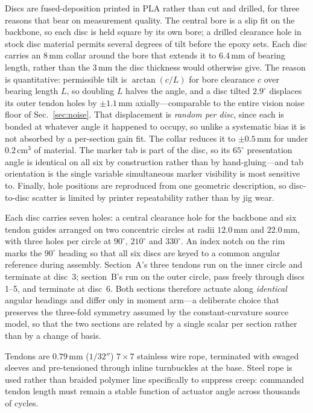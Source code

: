 \documentclass[letterpaper, 10pt, conference]{ieeeconf}
\begin{document}
Discs are fused-deposition printed in PLA rather than cut and drilled, for
three reasons that bear on measurement quality. The central bore is a
slip fit on the backbone, so each disc is held square by its own bore; a
drilled clearance hole in stock disc material permits several degrees of tilt
before the epoxy sets. Each disc carries an $8\,$mm collar around the bore
that extends it to $6.4\,$mm of bearing length, rather than the $3\,$mm the
disc thickness would otherwise give. The reason is quantitative: permissible
tilt is $\arctan(c/L)$ for bore clearance $c$ over bearing length $L$, so
doubling $L$ halves the angle, and a disc tilted $2.9^\circ$ displaces its
outer tendon holes by $\pm1.1\,$mm axially---comparable to the entire vision
noise floor of Sec.~\ref{sec:noise}. That displacement is \emph{random per
disc}, since each is bonded at whatever angle it happened to occupy, so
unlike a systematic bias it is not absorbed by a per-section gain fit. The
collar reduces it to $\pm0.5\,$mm for under $0.2\,$cm$^3$ of material. The marker tab is part of the disc, so its
$65^\circ$ presentation angle is identical on all six by construction rather
than by hand-gluing---and tab orientation is the single variable simultaneous
marker visibility is most sensitive to. Finally, hole positions are
reproduced from one geometric description, so disc-to-disc scatter is limited
by printer repeatability rather than by jig wear.

Each disc carries seven holes: a central clearance hole for the backbone and
six tendon guides arranged on two concentric circles at radii $12.0\,$mm and
$22.0\,$mm, with three holes per circle at $90^\circ$, $210^\circ$ and
$330^\circ$. An index notch on the rim marks the $90^\circ$ heading so that
all six discs are keyed to a common angular reference during assembly.
Section~A's three tendons run on the inner circle and terminate
at disc~3; section~B's run on the outer circle, pass freely through discs 1--5,
and terminate at disc~6. Both sections therefore actuate along
\emph{identical} angular headings and differ only in moment arm---a
deliberate choice that preserves the three-fold symmetry assumed by the
constant-curvature source model, so that the two sections are related by a
single scalar per section rather than by a change of basis.

Tendons are $0.79\,$mm ($1/32''$) $7\times7$ stainless wire rope, terminated
with swaged sleeves and pre-tensioned through inline turnbuckles at the base.
Steel rope is used rather than braided polymer line specifically to suppress
creep: commanded tendon length must remain a stable function of actuator
angle across thousands of cycles.
\end{document}
